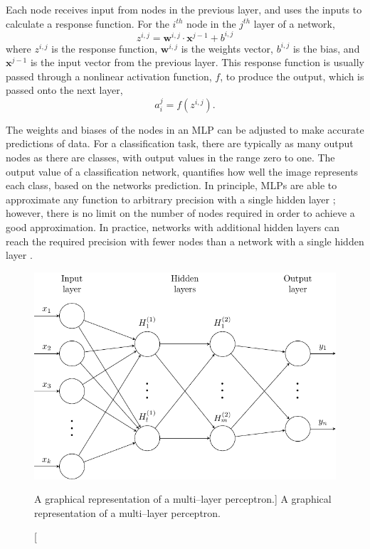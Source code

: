 Each node receives input from nodes in the previous layer, and uses the inputs
to calculate a response function. For the $i^{th}$ node in the $j^{th}$ layer 
of a network, 
\begin{equation*}
	z^{i,j} = \mathbf{w}^{i,j} \cdot \mathbf{x}^{j-1} + b^{i,j}
\end{equation*}
where $z^{i,j}$ is the response function, $\mathbf{w}^{i,j}$ is the weights
vector, $b^{i,j}$ is the bias, and $\mathbf{x}^{j-1}$ is the input vector from 
the previous layer. This response function is usually passed through a
nonlinear activation function, $f$, to produce the output, which is passed onto
the next layer,
\begin{equation*}
	a^j_i = f \left( z^{i,j} \right).
\end{equation*}

The weights and biases of the nodes in an MLP can be adjusted to make accurate 
predictions of data. For a classification task, there are typically as many
output nodes as there are classes, with output values in the range zero to one. 
The output value of a classification network, quantifies how well the image
represents each class, based on the networks prediction. In principle, MLPs 
are able to approximate any function to arbitrary precision with a 
single hidden layer \cite{Cybenko1989ApproximationBS}; however, there is no 
limit on the number of nodes required in order to achieve a good 
approximation. In practice, networks with additional hidden layers can reach 
the required precision with fewer nodes than a network with a single hidden 
layer \cite{Lecun2015}.
\begin{figure}

	\centering

	\includegraphics[width = \textwidth]{figures/mlp.pdf}

	\caption
	[A graphical representation of a multi--layer perceptron.]
	{ A graphical representation of a multi--layer perceptron. }

	\label{fig:mlp}

\end{figure}

